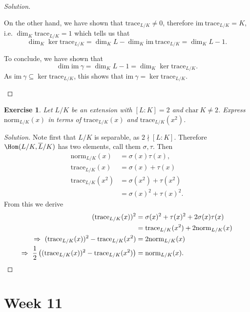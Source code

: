 \documentclass[a4paper,10pt,reqno]{amsart}
\newtheorem{ex}{Exercise}[section]
\newenvironment{sol}
  {\renewcommand\qedsymbol{$\blacksquare$}\begin{proof}[Solution]}
  {\end{proof}}
\begin{document}
\begin{sol}
\begin{enumerate}[label=(\roman*)]
        On the other hand, we have shown that $\mathrm{trace}_{L/K} \neq 0$, therefore $\mathrm{im}\  \mathrm{trace}_{L/K} = K$, i.e. $\dim_K \mathrm{trace}_{L/K} = 1$ which tells us that
        \[
        \dim_K \ker \mathrm{trace}_{L/K} = \dim_KL - \dim_K \mathrm{im} \ \mathrm{trace}_{L/K} = \dim_KL - 1.
        \]

        To conclude, we have shown that
        \[
        \dim \mathrm{im}\ \gamma  = \dim_KL - 1 = \dim_K \ker \mathrm{trace}_{L/K}.
        \]
        As $\mathrm{im}\ \gamma \subseteq \ker \mathrm{trace}_{L/K}$, this shows that $\mathrm{im}\ \gamma = \ker \mathrm{trace}_{L/K}$.\qedhere
    \end{enumerate}
\end{sol}


\begin{ex}
\label{10.5}
    Let $L/K$ be an extension with $[L:K] = 2$ and $\mathrm{char}\ K \neq 2$. Express $\mathrm{norm}_{L/K}(x)$ in terms of $\mathrm{trace}_{L/K}(x)$ and $\mathrm{trace}_{L/K}(x^2)$.
\end{ex}
\begin{sol}
    Note first that $L/K$ is separable, as $2 \nmid [L:K]$. Therefore $\Hom(L/K,\overline{L}/K)$ has two elements, call them $\sigma,\tau$. Then
    \begin{align*}
        \mathrm{norm}_{L/K}(x) & = \sigma(x)\tau(x), \\
        \mathrm{trace}_{L/K}(x) & = \sigma(x)+ \tau(x) \\
         \mathrm{trace}_{L/K}(x^2) & = \sigma(x^2) + \tau(x^2) \\
         & = \sigma(x)^2 + \tau(x)^2.
    \end{align*}
    From this we derive
    \begin{align*}
        (\mathrm{trace}_{L/K}(x))^2 & = \sigma(x)^2 + \tau(x)^2 + 2 \sigma(x)\tau(x) \\
        & = \mathrm{trace}_{L/K}(x^2) + 2 \mathrm{norm}_{L/K}(x) \\
       \Rightarrow \ (\mathrm{trace}_{L/K}(x))^2 - \mathrm{trace}_{L/K}(x^2) & = 2 \mathrm{norm}_{L/K}(x) \\
       \Rightarrow \ \frac{1}{2} \left( (\mathrm{trace}_{L/K}(x))^2 - \mathrm{trace}_{L/K}(x^2) \right) & =  \mathrm{norm}_{L/K}(x).\qedhere
    \end{align*}
\end{sol}

\newpage
\section{Week 11}
\end{document}
